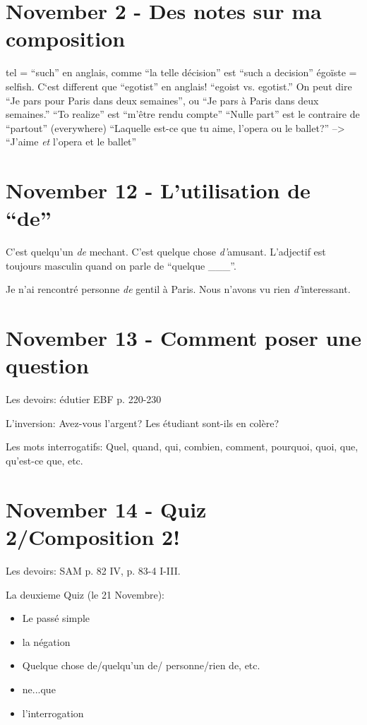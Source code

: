 \documentclass{report}
\begin{document}
\section{November 2 - Des notes sur ma composition}
tel = ``such'' en anglais, comme ``la telle d\'ecision'' est ``such a decision''
\'ego\"iste = selfish. C`est different que ``egotist'' en anglais! ``egoist vs. egotist.''
On peut dire ``Je pars pour Paris dans deux semaines'', ou ``Je pars \`a Paris dans deux semaines.''
``To realize'' est ``m'\^etre rendu compte''
``Nulle part'' est le contraire de ``partout'' (everywhere)
``Laquelle est-ce que tu aime, l'opera ou le ballet?'' --> ``J'aime \emph{et} l'opera et le ballet''

\section{November 12 - L'utilisation de ``de''}

C'est quelqu'un \emph{de} mechant. C'est quelque chose \emph{d'}amusant. L'adjectif est toujours masculin quand on parle de ``quelque \_\_\_''.

Je n'ai rencontr\'e personne \emph{de} gentil \`a Paris. Nous n'avons vu rien \emph{d'}interessant. 

\section{November 13 - Comment poser une question}

Les devoirs: \'edutier EBF p. 220-230

L'inversion: Avez-vous l'argent? Les \'etudiant sont-ils en col\`ere? 

Les mots interrogatifs: Quel, quand, qui, combien, comment, pourquoi, quoi, que, qu'est-ce que, etc.

\section{November 14 - Quiz 2/Composition 2!}

Les devoirs: SAM p. 82 IV, p. 83-4 I-III. 

La deuxieme Quiz (le 21 Novembre):
\begin{itemize}
\item Le pass\'e simple
\item la n\'egation
\item Quelque chose de/quelqu'un de/ personne/rien de, etc.
\item ne...que
\item l'interrogation
\end{itemize}
\end{document}
